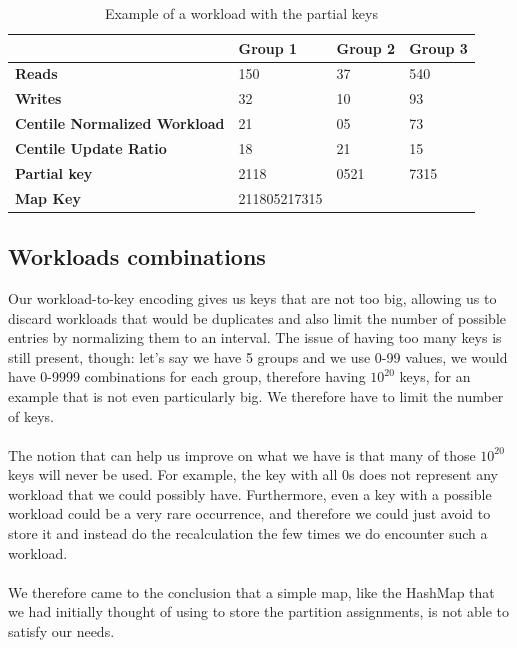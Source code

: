 \begin{table}[!htb]
  \centering
  \begin{tabular}{l l l l}
    \hline
    & \textbf{Group 1} & \textbf{Group 2} & \textbf{Group 3} \\
    \hline
    \textbf{Reads} & 150 & 37 & 540 \\
    \textbf{Writes} & 32 & 10 & 93 \\
    \hline
    \textbf{Centile Normalized Workload} & 21 & 05 & 73 \\
    \textbf{Centile Update Ratio} & 18 & 21 & 15 \\
    \textbf{Partial key} & 2118 & 0521 & 7315 \\
    \hline
    \textbf{Map Key} & 211805217315 & & \\
  \end{tabular}
  \caption{Example of a workload with the partial keys}\label{tab:lru-workload-example}
\end{table}


\subsection{Workloads combinations}\label{sec:Workloads-combinations}
Our workload-to-key encoding gives us keys that are not too big, allowing us to discard workloads that would be duplicates and also limit the number of possible entries by normalizing them to an interval. The issue of having too many keys is still present, though: let's say we have 5 groups and we use 0-99 values, we would have 0-9999 combinations for each group, therefore having $10^{20}$ keys, for an example that is not even particularly big. We therefore have to limit the number of keys. 
\\\\
The notion that can help us improve on what we have is that many of those $10^{20}$ keys will never be used. For example, the key with all 0s does not represent any workload that we could possibly have. Furthermore, even a key with a possible workload could be a very rare occurrence, and therefore we could just avoid to store it and instead do the recalculation the few times we do encounter such a workload. 
\\\\
We therefore came to the conclusion that a simple map, like the HashMap that we had initially thought of using to store the partition assignments, is not able to satisfy our needs.

